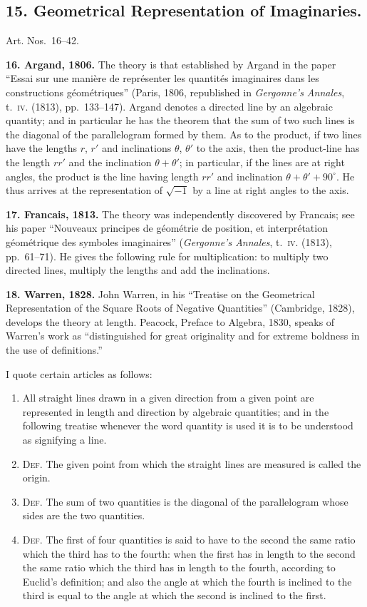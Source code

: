 \documentclass[11pt,a4paper]{book}
\begin{document}
\subsection*{15. Geometrical Representation of Imaginaries.}

Art. Nos.~16--42.

\textbf{16. Argand, 1806.} The theory is that established by Argand in the paper ``Essai sur une mani\`ere de repr\'esenter les quantit\'es imaginaires dans les constructions g\'eom\'etriques'' (Paris, 1806, republished in \textit{Gergonne's Annales}, t.~\textsc{iv}. (1813), pp.~133--147). Argand denotes a directed line by an algebraic quantity; and in particular he has the theorem that the sum of two such lines is the diagonal of the parallelogram formed by them. As to the product, if two lines have the lengths $r$, $r'$ and inclinations $\theta$, $\theta'$ to the axis, then the product-line has the length $rr'$ and the inclination $\theta + \theta'$; in particular, if the lines are at right angles, the product is the line having length $rr'$ and inclination $\theta + \theta' + 90^{\circ}$. He thus arrives at the representation of $\sqrt{-1}$ by a line at right angles to the axis.

\textbf{17. Francais, 1813.} The theory was independently discovered by Francais; see his paper ``Nouveaux principes de g\'eom\'etrie de position, et interpr\'etation g\'eom\'etrique des symboles imaginaires'' (\textit{Gergonne's Annales}, t.~\textsc{iv}. (1813), pp.~61--71). He gives the following rule for multiplication: to multiply two directed lines, multiply the lengths and add the inclinations.

\textbf{18. Warren, 1828.} John Warren, in his ``Treatise on the Geometrical Representation of the Square Roots of Negative Quantities'' (Cambridge, 1828), develops the theory at length. Peacock, Preface to Algebra, 1830, speaks of Warren's work as ``distinguished for great originality and for extreme boldness in the use of definitions.''

I quote certain articles as follows:
\begin{enumerate}[label=(\arabic*)]
\item All straight lines drawn in a given direction from a given point are represented in length and direction by algebraic quantities; and in the following treatise whenever the word quantity is used it is to be understood as signifying a line.
\item \textsc{Def.} The given point from which the straight lines are measured is called the origin.
\item \textsc{Def.} The sum of two quantities is the diagonal of the parallelogram whose sides are the two quantities.
\setcounter{enumi}{11}
\item \textsc{Def.} The first of four quantities is said to have to the second the same ratio which the third has to the fourth: when the first has in length to the second the same ratio which the third has in length to the fourth, according to Euclid's definition; and also the angle at which the fourth is inclined to the third is equal to the angle at which the second is inclined to the first.
\end{enumerate}
\end{document}
